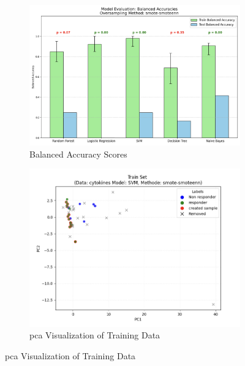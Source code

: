 \documentclass[12pt,a4paper]{report}
\begin{document}
\begin{figure}[h!]
    \centering

    \begin{subfigure}[b]{0.48\textwidth}
        \centering
        \includegraphics[width=\textwidth]{images/smote_een_fig1a.png}
        \caption{Balanced Accuracy Scores}
        \label{fig:smote_enn_fig1a}
    \end{subfigure}
    \hfill
    \begin{subfigure}[b]{0.48\textwidth}
        \centering
        \includegraphics[width=0.9\linewidth]{images/smote_een_fig1b.png}
        \caption{\gls{pca} Visualization of Training Data}
        \label{fig:smote_enn_fig1b}
    \end{subfigure}

    \vspace{1em}


\end{figure}
\end{document}
